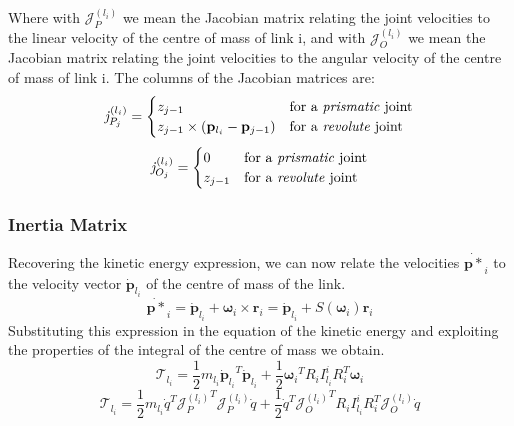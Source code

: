 Where with $\mathcal{J}_P^{(l_i)}$ we mean the Jacobian matrix relating the joint velocities to the linear velocity of the centre of mass of link i, and with $\mathcal{J}_O^{(l_i)}$ we mean the Jacobian matrix relating the joint velocities to the angular velocity of the centre of mass of link i. 
The columns of the Jacobian matrices are:
\begin{equation}
	\mathit{j}_{P_j}^{(l_i)}=
	\begin{cases}
		z_{j-1} & \text{for a \textit{prismatic} joint} \\
		z_{j-1}\times \left(\mathbf{p}_{l_i}-\mathbf{p}_{j-1}\right) & \text{for a \textit{revolute} joint}	
	\end{cases}                                             
\end{equation}
\begin{equation}
	\mathit{j}_{O_j}^{(l_i)}= 
	\begin{cases}
		0 & \text{for a \textit{prismatic} joint} \\
		z_{j-1} & \text{for a \textit{revolute} joint}	
	\end{cases} 
\end{equation}

\subsubsection{Inertia Matrix}
Recovering the kinetic energy expression, we can now relate the velocities $ {\dot{\mathbf{p}*}}_i$ to the velocity vector ${\dot{\mathbf{p}}}_{l_i}$ of the centre of mass of the link.
\begin{equation}
	{\dot{\mathbf{p}*}}_i={\dot{\mathbf{p}}}_{l_i}+\boldsymbol{\omega}_i\times\mathbf{r}_i={\dot{\mathbf{p}}}_{l_i}+S(\boldsymbol{\omega}_i)\mathbf{r}_i
\end{equation}
Substituting this expression in the equation of the kinetic energy and exploiting the properties of the integral of the centre of mass we obtain.
\begin{equation} \label{iniziodinamica}
	\mathcal{T}_{l_i}= \frac{1}{2}m_{l_i}{{\dot{\mathbf{p}}}_{l_i}}^T{\dot{\mathbf{p}}}_{l_i}+\frac{1}{2}{\boldsymbol{\omega}_i}^TR_iI_{l_i}^iR_i^T\boldsymbol{\omega}_i
\end{equation}
\begin{equation}
	\mathcal{T}_{l_i}= \frac{1}{2}m_{l_i}{\dot{q}}^T{\mathcal{J}_P^{(l_i)}}^T\mathcal{J}_P^{(l_i)}\dot{q}+\frac{1}{2}{\dot{q}}^T{\mathcal{J}_O^{(l_i)}}^TR_iI_{l_i}^iR_i^T\mathcal{J}_O^{(l_i)}\dot{q}
\end{equation}

